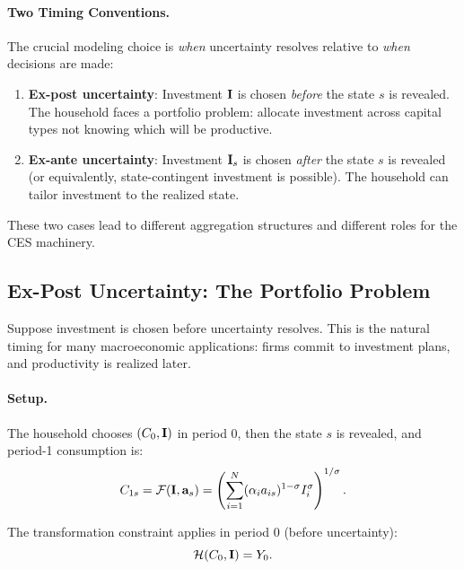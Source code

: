 \paragraph{Two Timing Conventions.}
The crucial modeling choice is \emph{when} uncertainty resolves relative to \emph{when} decisions are made:

\begin{enumerate}[label=(\roman*)]
\item \textbf{Ex-post uncertainty}: Investment $\mathbf{I}$ is chosen \emph{before} the state $s$ is revealed. The household faces a portfolio problem: allocate investment across capital types not knowing which will be productive.

\item \textbf{Ex-ante uncertainty}: Investment $\mathbf{I}_s$ is chosen \emph{after} the state $s$ is revealed (or equivalently, state-contingent investment is possible). The household can tailor investment to the realized state.
\end{enumerate}

These two cases lead to different aggregation structures and different roles for the CES machinery.

\subsection{Ex-Post Uncertainty: The Portfolio Problem}
\label{subsec:ac-risk-expost}

Suppose investment is chosen before uncertainty resolves. This is the natural timing for many macroeconomic applications: firms commit to investment plans, and productivity is realized later.

\paragraph{Setup.}
The household chooses $(C_0, \mathbf{I})$ in period 0, then the state $s$ is revealed, and period-1 consumption is:
\begin{equation}
C_{1s} = \mathcal{F}(\mathbf{I}, \mathbf{a}_s) = \left( \sum_{i=1}^{N} (\alpha_i a_{is})^{1-\sigma} I_i^{\sigma} \right)^{1/\sigma}.
\label{eq:ac-risk-C1s}
\end{equation}

The transformation constraint applies in period 0 (before uncertainty):
\begin{equation}
\mathcal{H}(C_0, \mathbf{I}) = Y_0.
\label{eq:ac-risk-H0}
\end{equation}

